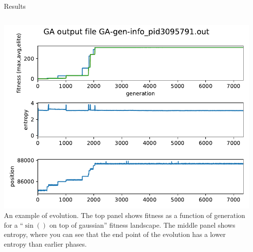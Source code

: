 \documentclass[10pt,aspectratio=169]{beamer}
\begin{document}
\begin{frame}{Results}
  \begin{columns} %
    \begin{column}{0.4\textwidth}
      \includegraphics[width=\textwidth]{GA-gen-info_pid3095791.out.pdf}
                      {\tiny An example of evolution.  The top panel shows fitness as a
                      function of generation for a ``$\sin()$ on top of gaussian''
                      fitness landscape.  The
                      middle panel shows entropy, where you can see that the end point
                      of the evolution has a lower entropy than earlier phases.}
    \end{column}


\end{columns}
\end{frame}
\end{document}
